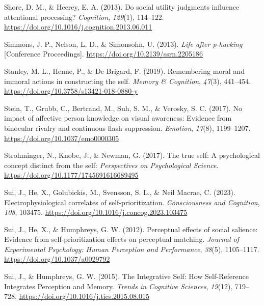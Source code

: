 \documentclass[
  man]{apa6}
\newlength{\cslhangindent}
\newlength{\cslentryspacingunit} %
\newenvironment{CSLReferences}[2] %
 {%
  \setlength{\parindent}{0pt}
  \ifodd #1
  \let\oldpar\par
  \def\par{\hangindent=\cslhangindent\oldpar}
  \fi
  \setlength{\parskip}{#2\cslentryspacingunit}
 }%
 {}
\begin{document}
\begin{CSLReferences}{1}{0}
\leavevmode{}%
Shore, D. M., \& Heerey, E. A. (2013). Do social utility judgments influence attentional processing? \emph{Cognition}, \emph{129}(1), 114--122. \url{https://doi.org/10.1016/j.cognition.2013.06.011}

\leavevmode{}%
Simmons, J. P., Nelson, L. D., \& Simonsohn, U. (2013). \emph{Life after p-hacking} {[}Conference Proceedings{]}. \url{https://doi.org/10.2139/ssrn.2205186}

\leavevmode{}%
Stanley, M. L., Henne, P., \& De Brigard, F. (2019). Remembering moral and immoral actions in constructing the self. \emph{Memory \& Cognition}, \emph{47}(3), 441--454. \url{https://doi.org/10.3758/s13421-018-0880-y}

\leavevmode{}%
Stein, T., Grubb, C., Bertrand, M., Suh, S. M., \& Verosky, S. C. (2017). No impact of affective person knowledge on visual awareness: Evidence from binocular rivalry and continuous flash suppression. \emph{Emotion}, \emph{17}(8), 1199--1207. \url{https://doi.org/10.1037/emo0000305}

\leavevmode{}%
Strohminger, N., Knobe, J., \& Newman, G. (2017). The true self: A psychological concept distinct from the self: \emph{Perspectives on Psychological Science}. \url{https://doi.org/10.1177/1745691616689495}

\leavevmode{}%
Sui, J., He, X., Golubickis, M., Svensson, S. L., \& Neil Macrae, C. (2023). Electrophysiological correlates of self-prioritization. \emph{Consciousness and Cognition}, \emph{108}, 103475. \url{https://doi.org/10.1016/j.concog.2023.103475}

\leavevmode{}%
Sui, J., He, X., \& Humphreys, G. W. (2012). Perceptual effects of social salience: Evidence from self-prioritization effects on perceptual matching. \emph{Journal of Experimental Psychology: Human Perception and Performance}, \emph{38}(5), 1105--1117. \url{https://doi.org/10.1037/a0029792}

\leavevmode{}%
Sui, J., \& Humphreys, G. W. (2015). The {Integrative} {Self}: {How} {Self}-{Reference} {Integrates} {Perception} and {Memory}. \emph{Trends in Cognitive Sciences}, \emph{19}(12), 719--728. \url{https://doi.org/10.1016/j.tics.2015.08.015}


\end{CSLReferences}
\end{document}
